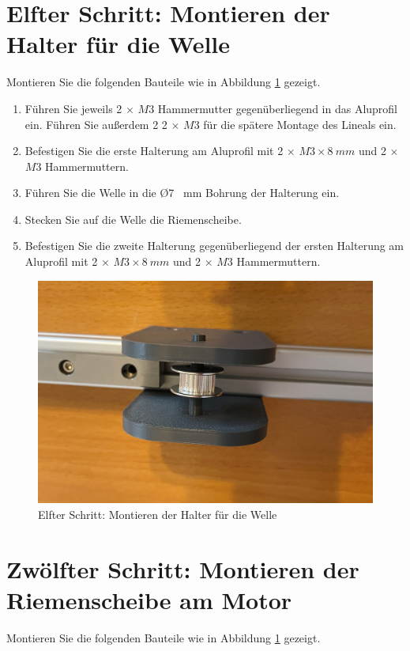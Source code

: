 \section{Elfter Schritt: Montieren der Halter für die Welle}
Montieren Sie die folgenden Bauteile wie in Abbildung \ref{11.S} gezeigt.

\begin{enumerate}
	\item Führen Sie jeweils 2 $\times$ $ M3 $ Hammermutter gegenüberliegend in das Aluprofil ein. Führen Sie außerdem 2 2 $\times$ $ M3 $ für die spätere Montage des Lineals ein. 
	\item Befestigen Sie die erste Halterung am Aluprofil mit 2 $\times$ $ M3 \times 8 \ mm $ und 2 $\times$ $ M3 $ Hammermuttern.
	\item Führen Sie die Welle in die \O 7 \ mm Bohrung der Halterung ein.
	\item Stecken Sie auf die Welle die Riemenscheibe.
	\item Befestigen Sie die zweite Halterung gegenüberliegend der ersten Halterung am Aluprofil mit 2 $\times$ $ M3 \times 8 \ mm $ und 2 $\times$ $ M3 $ Hammermuttern.
\end{enumerate}

\begin{figure}[H]
	\begin{center}
		\includegraphics[width=\textwidth]{Images/11Schr.jpg}
		\caption{Elfter Schritt: Montieren der Halter für die Welle} \label{11.S}
	\end{center}
\end{figure}


\section{Zwölfter Schritt: Montieren der Riemenscheibe am Motor}
Montieren Sie die folgenden Bauteile wie in Abbildung \ref{11.S} gezeigt.

